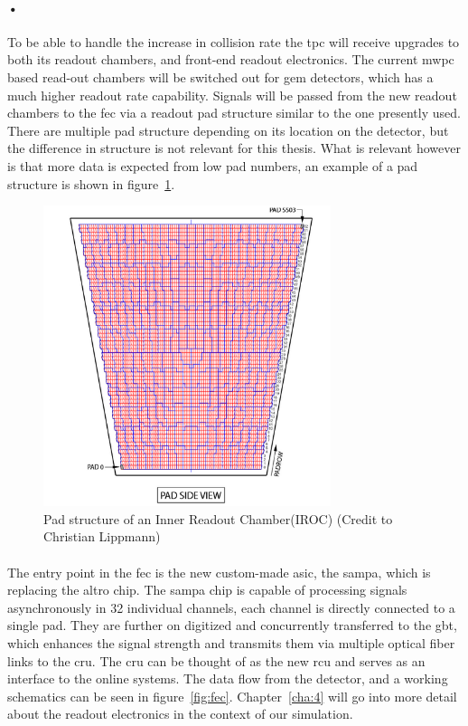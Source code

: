 \documentclass[a4paper]{report}
\begin{document}
\paragraph{•} %
{\color{red} To be able to handle the increase in collision rate the \gls{tpc} will receive upgrades to both its readout chambers, and front-end readout electronics.
The current \gls{mwpc} based read-out chambers will be switched out for \gls{gem} detectors, which has a much higher readout rate capability.
Signals will be passed from the new readout chambers to the \gls{fec} via a readout pad structure similar to the one presently used.
There are multiple pad structure depending on its location on the detector, but the difference in structure is not relevant for this thesis.
What is relevant however is that more data is expected from low pad numbers, an example of a pad structure is shown in figure~\ref{fig:pad-struct}.

\begin{figure}[h!]
	\centering
		\includegraphics[width=0.75\textwidth]{images/pad-structure.png}
		\caption{Pad structure of an Inner Readout Chamber(IROC) (Credit to Christian Lippmann)}
		\label{fig:pad-struct}
\end{figure}

\paragraph{}
The entry point in the \gls{fec} is the new custom-made \gls{asic}, the \gls{sampa}, which is replacing the \gls{altro} chip.\cite{tdr-015}
The \gls{sampa} chip is capable of processing signals asynchronously in 32 individual channels, each channel is directly connected to a single pad.
They are further on digitized and concurrently transferred to the \gls{gbt}, which enhances the signal strength and transmits them via multiple optical fiber links to the \gls{cru}.
The \gls{cru} can be thought of as the new \gls{rcu} and serves as an interface to the online systems.
The data flow from the detector, and a working schematics can be seen in figure~\ref{fig:fec}.
Chapter~\ref{cha:4} will go into more detail about the readout electronics in the context of our simulation.}
\end{document}
